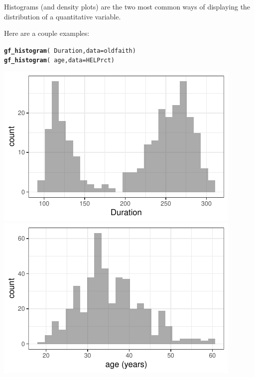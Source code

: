 \documentclass[twoside]{book}\usepackage[]{graphicx}\usepackage[]{xcolor}
\makeatletter
\def\maxwidth{ %
  \ifdim\Gin@nat@width>\linewidth
    \linewidth
  \else
    \Gin@nat@width
  \fi
}
\newcommand{\hlopt}[1]{\textcolor[rgb]{0,0,0}{#1}}%
\newcommand{\hlstd}[1]{\textcolor[rgb]{0.345,0.345,0.345}{#1}}%
\newcommand{\hlkwc}[1]{\textcolor[rgb]{0.333,0.667,0.333}{#1}}%
\newcommand{\hlkwd}[1]{\textcolor[rgb]{0.737,0.353,0.396}{\textbf{#1}}}%
\newenvironment{kframe}{%
 \def\at@end@of@kframe{}%
 \ifinner\ifhmode%
  \def\at@end@of@kframe{\end{minipage}}%
  \begin{minipage}{\columnwidth}%
 \fi\fi%
 \def\FrameCommand##1{\hskip\@totalleftmargin \hskip-\fboxsep
 \colorbox{shadecolor}{##1}\hskip-\fboxsep
     \hskip-\linewidth \hskip-\@totalleftmargin \hskip\columnwidth}%
 \MakeFramed {\advance\hsize-\width
   \@totalleftmargin\z@ \linewidth\hsize
   \@setminipage}}%
 {\par\unskip\endMakeFramed%
 \at@end@of@kframe}
\newenvironment{knitrout}{}{} %
\newcounter{example}[section]
\makeatother
\begin{document}
Histograms (and density plots) are the two most common ways of displaying the distribution 
of a quantitative variable.


Here are a couple examples:

\begin{knitrout}
\color{fgcolor}\begin{kframe}
\begin{alltt}
\hlkwd{gf_histogram}\hlstd{(} \hlopt{~} \hlstd{Duration,} \hlkwc{data} \hlstd{= oldfaith)}
\hlkwd{gf_histogram}\hlstd{(} \hlopt{~} \hlstd{age,} \hlkwc{data} \hlstd{= HELPrct)}
\end{alltt}
\end{kframe}

{\centering \includegraphics[width=\maxwidth]{figures/fig-histogram-1} 
\includegraphics[width=\maxwidth]{figures/fig-histogram-2} 

}



\end{knitrout}
\end{document}
